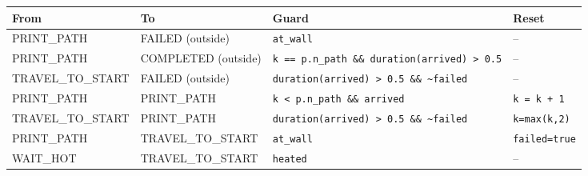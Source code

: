\begin{tabular}{@{}llp{}p{}@{}}
\toprule
From & To & Guard & Reset \\
\midrule
PRINT\_PATH & FAILED (outside) & \texttt{at\_wall} & -- \\
PRINT\_PATH & COMPLETED (outside) & \texttt{k == p.n\_path \&\& duration(arrived) > 0.5} & -- \\
TRAVEL\_TO\_START & FAILED (outside) & \texttt{duration(arrived) > 0.5 \&\& \textasciitilde{}failed} & -- \\
PRINT\_PATH & PRINT\_PATH & \texttt{k < p.n\_path \&\& arrived} & \texttt{k = k + 1} \\
TRAVEL\_TO\_START & PRINT\_PATH & \texttt{duration(arrived) > 0.5 \&\& \textasciitilde{}failed} & \texttt{k=max(k,2)} \\
PRINT\_PATH & TRAVEL\_TO\_START & \texttt{at\_wall} & \texttt{failed=true} \\
WAIT\_HOT & TRAVEL\_TO\_START & \texttt{heated} & -- \\
\bottomrule
\end{tabular}
